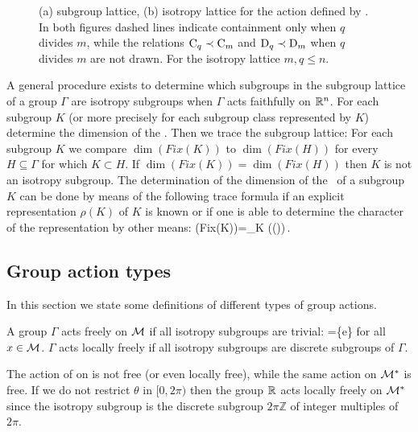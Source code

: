 \begin{example}
\begin{figure}
\begin{center}
\end{center}
\caption[O(2) lattices]{
    {\small
    (a)  subgroup lattice, (b)  isotropy lattice for the action
	defined by . In both figures dashed lines indicate
	containment only when $q$ divides $m$, while the relations $\mathrm{C}_{q}\prec\mathrm{C}_{m}$
	and $\mathrm{D}_{q}\prec\mathrm{D}_{m}$ when $q$ divides $m$ are not drawn. For the isotropy lattice $m,q\le n$.
	}}
\label{fig:O2lattice}
    \vspace*{-5pt}
\end{figure}

\end{example}

A general procedure exists to determine which subgroups in the subgroup lattice of a group $\Gamma$ are isotropy
subgroups when $\Gamma$ acts faithfully on $\mathbb{R}^{n}$.
For each subgroup $K$ (or more precisely for each subgroup class represented by $K$)
determine the dimension of the \fixedsp. Then we trace the subgroup lattice: For each subgroup
$K$ we compare $\dim(Fix(K))$ to $\dim(Fix(H))$ for every $H\subseteq\Gamma$ for which $K\subset H$.
If  $\dim(Fix(K))=\dim(Fix(H))$ then $K$ is not an isotropy subgroup. The determination of the dimension of the
\fixedsp\ of a subgroup $K$ can be done by means of the following trace formula if an explicit representation
$\rho(K)$ of $K$ is known or if one is able to determine the character of the representation by other means:
\beq
	\dim(Fix(K))=\sum_{\kappa\in K} \trace(\rho(\kappa))\,.
\eeq


\subsection{Group action types}

In this section we state some definitions of different types of group actions.

\begin{definition}
\label{def:free}
A group $\Gamma$ acts freely on $\mathcal{M}$ if all isotropy subgroups are trivial: =\{e\} for all $x\in \mathcal{M}$.
$\Gamma$ acts locally freely if all isotropy subgroups are discrete subgroups of $\Gamma$.
\end{definition}

\begin{example}
The action  of  on  is not free (or even locally free), while the same action on $\mathcal{M}^*$ is free. If we do not
restrict $\theta$ in $[0,2\pi)$ then the group $\mathbb{R}^{}$ acts locally freely on $\mathcal{M}^*$
since the isotropy subgroup is the discrete subgroup $2\pi\mathbb{Z}$ of integer multiples of $2\pi$.
\end{example}


